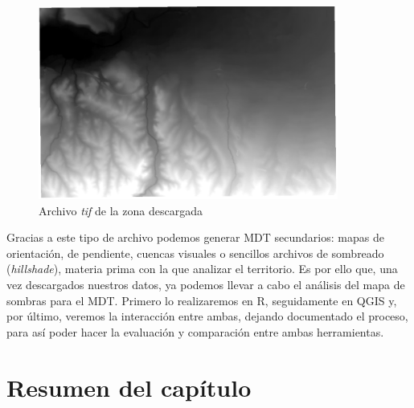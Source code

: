 \begin{enumerate}
	\begin{figure}[H]
		\centering
		\includegraphics[height=6.35cm]{imagenes/capitulo2/4_Paso3-Obtencion.png}
		\caption{Archivo \textit{tif} de la zona descargada}
		\label{fig:tif}
	\end{figure}	
\end{enumerate}

Gracias a este tipo de archivo podemos generar MDT secundarios: mapas de orientación, de pendiente, cuencas visuales o sencillos archivos de sombreado (\textit{hillshade}), materia prima con la que analizar el territorio. Es por ello que, una vez descargados nuestros datos, ya podemos llevar a cabo el análisis del mapa de sombras para el MDT. Primero lo realizaremos en R, seguidamente en QGIS y, por último, veremos la interacción entre ambas, dejando documentado el proceso, para así poder hacer la evaluación y comparación entre ambas herramientas.


\section{Resumen del capítulo}





